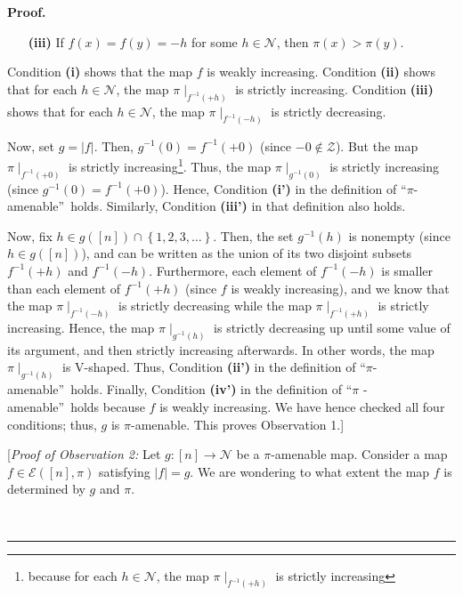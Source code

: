 \documentclass[numbers=enddot,12pt,final,onecolumn,notitlepage]{scrartcl}%
\theoremstyle{definition}
\newenvironment{proof}[1][Proof]{\noindent\textbf{#1.} }{\ \rule{0.5em}{0.5em}}
\begin{document}
\begin{proof}
\begin{enumerate}
\item[\textbf{(iii)}] If $f\left(  x\right)  =f\left(  y\right)  =-h$ for some
$h\in\mathcal{N}$, then $\pi\left(  x\right)  >\pi\left(  y\right)  $.
\end{enumerate}

Condition \textbf{(i)} shows that the map $f$ is weakly increasing. Condition
\textbf{(ii)} shows that for each $h\in\mathcal{N}$, the map $\pi\mid
_{f^{-1}\left(  +h\right)  }$ is strictly increasing. Condition \textbf{(iii)}
shows that for each $h\in\mathcal{N}$, the map $\pi\mid_{f^{-1}\left(
-h\right)  }$ is strictly decreasing.

Now, set $g=\left\vert f\right\vert $. Then, $g^{-1}\left(  0\right)
=f^{-1}\left(  +0\right)  $ (since $-0\notin\mathcal{Z}$). But the map
$\pi\mid_{f^{-1}\left(  +0\right)  }$ is strictly increasing\footnote{because
for each $h\in\mathcal{N}$, the map $\pi\mid_{f^{-1}\left(  +h\right)  }$ is
strictly increasing}. Thus, the map $\pi\mid_{g^{-1}\left(  0\right)  }$ is
strictly increasing (since $g^{-1}\left(  0\right)  =f^{-1}\left(  +0\right)
$). Hence, Condition \textbf{(i')} in the definition of \textquotedblleft$\pi
$-amenable\textquotedblright\ holds. Similarly, Condition \textbf{(iii')} in
that definition also holds.

Now, fix $h\in g\left(  \left[  n\right]  \right)  \cap\left\{  1,2,3,\ldots
\right\}  $. Then, the set $g^{-1}\left(  h\right)  $ is nonempty (since $h\in
g\left(  \left[  n\right]  \right)  $), and can be written as the union of its
two disjoint subsets $f^{-1}\left(  +h\right)  $ and $f^{-1}\left(  -h\right)
$. Furthermore, each element of $f^{-1}\left(  -h\right)  $ is smaller than
each element of $f^{-1}\left(  +h\right)  $ (since $f$ is weakly increasing),
and we know that the map $\pi\mid_{f^{-1}\left(  -h\right)  }$ is strictly
decreasing while the map $\pi\mid_{f^{-1}\left(  +h\right)  }$ is strictly
increasing. Hence, the map $\pi\mid_{g^{-1}\left(  h\right)  }$ is strictly
decreasing up until some value of its argument, and then strictly increasing
afterwards. In other words, the map $\pi\mid_{g^{-1}\left(  h\right)  }$ is
V-shaped. Thus, Condition \textbf{(ii')} in the definition of
\textquotedblleft$\pi$-amenable\textquotedblright\ holds. Finally, Condition
\textbf{(iv')} in the definition of \textquotedblleft$\pi$%
-amenable\textquotedblright\ holds because $f$ is weakly increasing. We have
hence checked all four conditions; thus, $g$ is $\pi$-amenable. This proves
Observation 1.]

[\textit{Proof of Observation 2:} Let $g:\left[  n\right]  \rightarrow
\mathcal{N}$ be a $\pi$-amenable map. Consider a map $f\in\mathcal{E}\left(
\left[  n\right]  ,\pi\right)  $ satisfying $\left\vert f\right\vert =g$. We
are wondering to what extent the map $f$ is determined by $g$ and $\pi$.


\end{proof}
\end{document}
